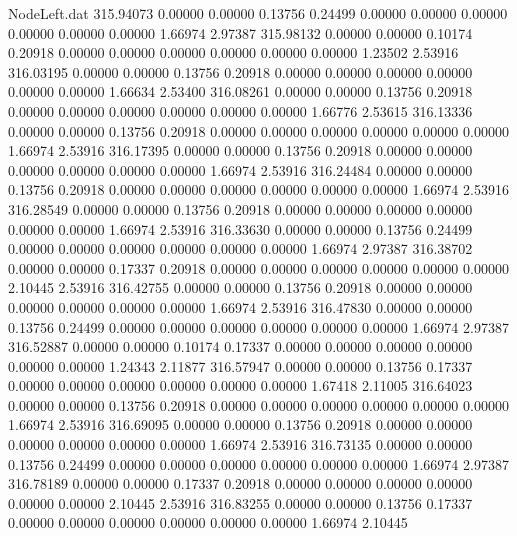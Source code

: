 \begin{filecontents}{NodeLeft.dat}
 315.94073    0.00000    0.00000     0.13756    0.24499    0.00000    0.00000    0.00000    0.00000    0.00000    0.00000    1.66974    2.97387
 315.98132    0.00000    0.00000     0.10174    0.20918    0.00000    0.00000    0.00000    0.00000    0.00000    0.00000    1.23502    2.53916
 316.03195    0.00000    0.00000     0.13756    0.20918    0.00000    0.00000    0.00000    0.00000    0.00000    0.00000    1.66634    2.53400
 316.08261    0.00000    0.00000     0.13756    0.20918    0.00000    0.00000    0.00000    0.00000    0.00000    0.00000    1.66776    2.53615
 316.13336    0.00000    0.00000     0.13756    0.20918    0.00000    0.00000    0.00000    0.00000    0.00000    0.00000    1.66974    2.53916
 316.17395    0.00000    0.00000     0.13756    0.20918    0.00000    0.00000    0.00000    0.00000    0.00000    0.00000    1.66974    2.53916
 316.24484    0.00000    0.00000     0.13756    0.20918    0.00000    0.00000    0.00000    0.00000    0.00000    0.00000    1.66974    2.53916
 316.28549    0.00000    0.00000     0.13756    0.20918    0.00000    0.00000    0.00000    0.00000    0.00000    0.00000    1.66974    2.53916
 316.33630    0.00000    0.00000     0.13756    0.24499    0.00000    0.00000    0.00000    0.00000    0.00000    0.00000    1.66974    2.97387
 316.38702    0.00000    0.00000     0.17337    0.20918    0.00000    0.00000    0.00000    0.00000    0.00000    0.00000    2.10445    2.53916
 316.42755    0.00000    0.00000     0.13756    0.20918    0.00000    0.00000    0.00000    0.00000    0.00000    0.00000    1.66974    2.53916
 316.47830    0.00000    0.00000     0.13756    0.24499    0.00000    0.00000    0.00000    0.00000    0.00000    0.00000    1.66974    2.97387
 316.52887    0.00000    0.00000     0.10174    0.17337    0.00000    0.00000    0.00000    0.00000    0.00000    0.00000    1.24343    2.11877
 316.57947    0.00000    0.00000     0.13756    0.17337    0.00000    0.00000    0.00000    0.00000    0.00000    0.00000    1.67418    2.11005
 316.64023    0.00000    0.00000     0.13756    0.20918    0.00000    0.00000    0.00000    0.00000    0.00000    0.00000    1.66974    2.53916
 316.69095    0.00000    0.00000     0.13756    0.20918    0.00000    0.00000    0.00000    0.00000    0.00000    0.00000    1.66974    2.53916
 316.73135    0.00000    0.00000     0.13756    0.24499    0.00000    0.00000    0.00000    0.00000    0.00000    0.00000    1.66974    2.97387
 316.78189    0.00000    0.00000     0.17337    0.20918    0.00000    0.00000    0.00000    0.00000    0.00000    0.00000    2.10445    2.53916
 316.83255    0.00000    0.00000     0.13756    0.17337    0.00000    0.00000    0.00000    0.00000    0.00000    0.00000    1.66974    2.10445

\end{filecontents}
